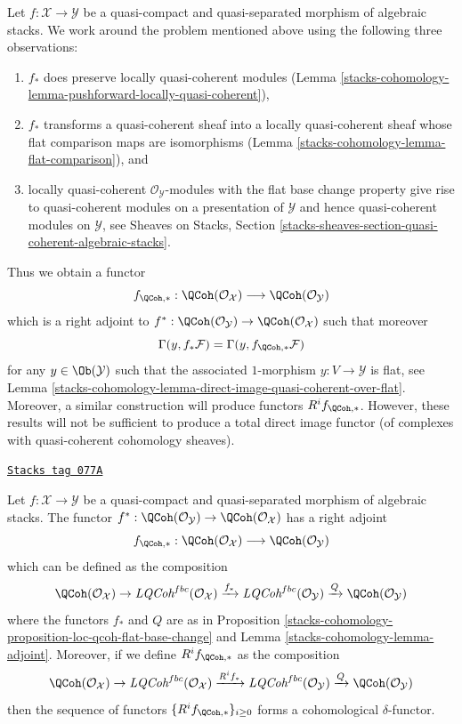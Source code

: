 \medskip\noindent
Let $f : \mathcal{X} \to \mathcal{Y}$ be a quasi-compact and
quasi-separated morphism of algebraic stacks. We work around the problem
mentioned above using the following three observations:
\begin{enumerate}
\item $f_*$ does preserve locally quasi-coherent
modules (Lemma \ref{stacks-cohomology-lemma-pushforward-locally-quasi-coherent}),
\item $f_*$ transforms a quasi-coherent sheaf into a locally quasi-coherent
sheaf whose flat comparison maps are isomorphisms
(Lemma \ref{stacks-cohomology-lemma-flat-comparison}), and
\item locally quasi-coherent $\mathcal{O}_\mathcal{Y}$-modules
with the flat base change property give rise to quasi-coherent
modules on a presentation of $\mathcal{Y}$ and hence quasi-coherent
modules on $\mathcal{Y}$, see
Sheaves on Stacks, Section
\ref{stacks-sheaves-section-quasi-coherent-algebraic-stacks}.
\end{enumerate}
Thus we obtain a functor
$$
f_{\QCoh, *} :
\QCoh(\mathcal{O}_\mathcal{X})
\longrightarrow
\QCoh(\mathcal{O}_\mathcal{Y})
$$
which is a right adjoint to
$f^* : \QCoh(\mathcal{O}_\mathcal{Y}) \to
\QCoh(\mathcal{O}_\mathcal{X})$
such that moreover
$$
\Gamma(y, f_*\mathcal{F}) = \Gamma(y, f_{\QCoh, *}\mathcal{F})
$$
for any $y \in \Ob(\mathcal{Y})$ such that the associated
$1$-morphism $y : V \to \mathcal{Y}$ is flat, see
Lemma \ref{stacks-cohomology-lemma-direct-image-quasi-coherent-over-flat}.
Moreover, a similar construction will produce functors
$R^if_{\QCoh, *}$.
However, these results will not be sufficient to produce a
total direct image functor (of complexes with quasi-coherent
cohomology sheaves).

\begin{proposition}
\label{stacks-cohomology-proposition-direct-image-quasi-coherent}
\href{https://stacks.math.columbia.edu/tag/077A}{\texttt{Stacks tag 077A}}

Let $f : \mathcal{X} \to \mathcal{Y}$ be a quasi-compact and quasi-separated
morphism of algebraic stacks. The functor
$f^* : \QCoh(\mathcal{O}_\mathcal{Y}) \to
\QCoh(\mathcal{O}_\mathcal{X})$
has a right adjoint
$$
f_{\QCoh, *} :
\QCoh(\mathcal{O}_\mathcal{X})
\longrightarrow
\QCoh(\mathcal{O}_\mathcal{Y})
$$
which can be defined as the composition
$$
\QCoh(\mathcal{O}_\mathcal{X}) \to
\textit{LQCoh}^{fbc}(\mathcal{O}_\mathcal{X})
\xrightarrow{f_*} \textit{LQCoh}^{fbc}(\mathcal{O}_\mathcal{Y})
\xrightarrow{Q} \QCoh(\mathcal{O}_\mathcal{Y})
$$
where the functors $f_*$ and $Q$ are as in
Proposition \ref{stacks-cohomology-proposition-loc-qcoh-flat-base-change}
and
Lemma \ref{stacks-cohomology-lemma-adjoint}.
Moreover, if we define $R^if_{\QCoh, *}$ as the composition
$$
\QCoh(\mathcal{O}_\mathcal{X}) \to
\textit{LQCoh}^{fbc}(\mathcal{O}_\mathcal{X})
\xrightarrow{R^if_*} \textit{LQCoh}^{fbc}(\mathcal{O}_\mathcal{Y})
\xrightarrow{Q} \QCoh(\mathcal{O}_\mathcal{Y})
$$
then the sequence of functors $\{R^if_{\QCoh, *}\}_{i \geq 0}$
forms a cohomological $\delta$-functor.
\end{proposition}

